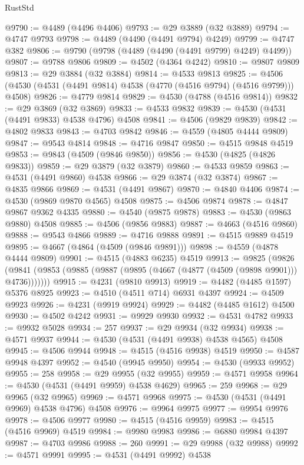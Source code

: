 \begin{lexlean}{RustStd}
\begin{coremodule}
{\begin{coremodule}
{{{{{{{{{{{{{{{{{{{{{{{{{{{{{{{{{{{{{{{{{{{{{{{{{{{{{{{@9790 := @4489 (@4496 @4406)
@9793 := @29 @3889 (@32 @3889)
@9794 := @4747 @9793
@9798 := @4489 (@4490 (@4491 @9794) @4249)
@9799 := @4747 @382
@9806 := @9790 (@9798 (@4489 (@4490 (@4491 @9799) @4249) @4499))
@9807 := @9788 @9806
@9809 := @4502 (@4364 @4242)
@9810 := @9807 @9809
@9813 := @29 @3884 (@32 @3884)
@9814 := @4533 @9813
@9825 := @4506 (@4530 (@4531 (@4491 @9814) @4538 (@4770 (@4516 @9794) (@4516 @9799))) @4508)
@9826 := @4779 @9814
@9829 := @4530 (@4788 (@4516 @9814))
@9832 := @29 @3869 (@32 @3869)
@9833 := @4533 @9832
@9839 := @4530 (@4531 (@4491 @9833) @4538 @4796) @4508
@9841 := @4506 (@9829 @9839)
@9842 := @4802 @9833
@9843 := @4703 @9842
@9846 := @4559 (@4805 @4444 @9809)
@9847 := @9543 @4814
@9848 := @4716 @9847
@9850 := @4515 @9848 @4519
@9853 := @9843 (@4509 (@9846 @9850))
@9856 := @4530 (@4825 (@4826 @9833))
@9859 := @29 @3879 (@32 @3879)
@9860 := @4533 @9859
@9863 := @4531 (@4491 @9860) @4538
@9866 := @29 @3874 (@32 @3874)
@9867 := @4835 @9866
@9869 := @4531 (@4491 @9867)
@9870 := @4840 @4406
@9874 := @4530 (@9869 @9870 @4565) @4508
@9875 := @4506 @9874
@9878 := @4847 @9867 @9362 @4335
@9880 := @4540 (@9875 @9878)
@9883 := @4530 (@9863 @9880) @4508
@9885 := @4506 (@9856 @9883)
@9887 := @4663 (@4516 @9860)
@9888 := @9543 @4866
@9889 := @4716 @9888
@9891 := @4515 @9889 @4519
@9895 := @4667 (@4864 (@4509 (@9846 @9891)))
@9898 := @4559 (@4878 @4444 @9809)
@9901 := @4515 (@4883 @6235) @4519
@9913 := @9825
    (@9826 (@9841 (@9853 (@9885 (@9887 (@9895 (@4667 (@4877 (@4509 (@9898 @9901))) @4736)))))))
@9915 := @4231 (@9810 @9913)
@9919 := @4482 (@4485 @1597) @5376 @8925
@9923 := @4510 (@4511 @714) @6931 @4397
@9924 := @4509 @9923
@9926 := @4231 (@9919 @9924)
@9929 := @4482 (@4485 @1612) @4500
@9930 := @4502 @4242
@9931 := @9929 @9930
@9932 := @4531 @4782
@9933 := @9932 @5028
@9934 := 257
@9937 := @29 @9934 (@32 @9934)
@9938 := @4571 @9937
@9944 := @4530 (@4531 (@4491 @9938) @4538 @4565) @4508
@9945 := @4506 @9944
@9948 := @4515 (@4516 @9938) @4519
@9950 := @4587 @9948 @4397
@9952 := @4540 (@9945 @9950)
@9954 := @4530 (@9933 @9952)
@9955 := 258
@9958 := @29 @9955 (@32 @9955)
@9959 := @4571 @9958
@9964 := @4530 (@4531 (@4491 @9959) @4538 @4629)
@9965 := 259
@9968 := @29 @9965 (@32 @9965)
@9969 := @4571 @9968
@9975 := @4530 (@4531 (@4491 @9969) @4538 @4796) @4508
@9976 := @9964 @9975
@9977 := @9954 @9976
@9978 := @4506 @9977
@9980 := @4515 (@4516 @9959)
@9983 := @4515 (@4516 @9969) @4519
@9984 := @9980 @9983
@9986 := @6880 @9984 @4397
@9987 := @4703 @9986
@9988 := 260
@9991 := @29 @9988 (@32 @9988)
@9992 := @4571 @9991
@9995 := @4531 (@4491 @9992) @4538
}}}}}}}}}}}}}}}}}}}}}}}}}}}}}}}}}}}}}}}}}}}}}}}}}}}}}}}
\end{coremodule}}
\end{coremodule}
\end{lexlean}

